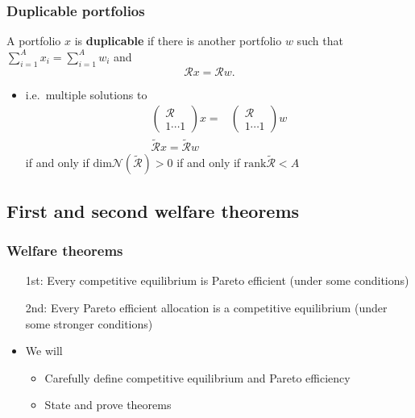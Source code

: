 \documentclass[compress]{beamer}
\newcommand{\rank}{\mathrm{rank}}
\renewcommand{\dim}{\mathrm{dim}}
\begin{document}
\begin{frame}
  \frametitle{Duplicable portfolios}
  \begin{definition}
    A portfolio $x$ is \textbf{duplicable} if there is
    another portfolio $w$ such that $\sum_{i=1}^A x_i = \sum_{i=1}^A w_i
    $ and 
    \[ \mathcal{R} x = \mathcal{R} w. \]
  \end{definition}
  \begin{itemize}
  \item i.e.\  multiple solutions to
    \begin{align*}
      \begin{pmatrix} \mathcal{R} \\ 1 \cdots 1 \end{pmatrix} x 
      = & \begin{pmatrix} \mathcal{R} \\ 1 \cdots 1 \end{pmatrix} w
      \\
      \widetilde{\mathcal{R}} x = \widetilde{\mathcal{R}} w
    \end{align*}
    if and only if $\dim \mathcal{N}(\widetilde{\mathcal{R}})> 0$ if and
    only if $\rank \widetilde{\mathcal{R}} < A$
  \end{itemize}
\end{frame}

\subsection{First and second welfare theorems}

\begin{frame}
  \frametitle{Welfare theorems}
  \begin{itemize}
  \item[1st:] Every competitive equilibrium is Pareto efficient (under
    some conditions)
  \item[2nd:] Every Pareto efficient allocation is a competitive
    equilibrium (under some stronger conditions)
  \item We will
    \begin{itemize}
    \item Carefully define competitive equilibrium and Pareto
      efficiency
    \item State and prove theorems
    \end{itemize}
  \end{itemize}
\end{frame}
\end{document}
